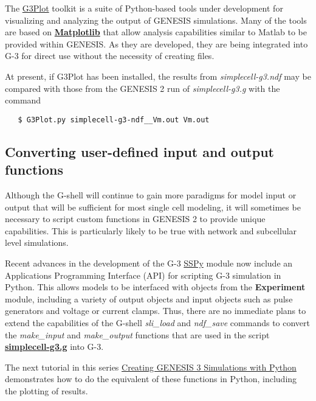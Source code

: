 \documentclass[12pt]{article}
\begin{document}
The \href{../g3plot/g3plot.html}{G3Plot} toolkit is a suite of Python-based tools under development
for visualizing and analyzing the output of GENESIS simulations.  Many of the tools are based on
\href{http://matplotlib.sourceforge.net/}{\bf Matplotlib} that allow
analysis capabilities similar to Matlab to be provided within GENESIS.  As
they are developed, they are being integrated into G-3 for direct use
without the necessity of creating files.

At present, if G3Plot has been installed, the results from {\it simplecell-g3.ndf} may be compared
with those from the GENESIS 2 run of {\it simplecell-g3.g} with the command
\begin{verbatim}
   $ G3Plot.py simplecell-g3-ndf__Vm.out Vm.out
\end{verbatim}

\subsection*{Converting user-defined input and output functions}

Although the G-shell will continue to gain more paradigms for model
input or output that will be sufficient for most single cell modeling,
it will sometimes be necessary to script custom functions in GENESIS 2
to provide unique capabilities.  This is particularly likely to be
true with network and subcellular level simulations.

Recent advances in the development of the G-3
\href{../SSPy/SSPy.html}{SSPy} module now include an Applications
Programming Interface (API) for scripting G-3 simulation in Python.  This
allows models to be interfaced with objects from the {\bf Experiment}
module, including a variety of output objects and input objects such as
pulse generators and voltage or current clamps.  Thus, there are no
immediate plans to extend the capabilities of the G-shell {\it sli\_load}
and {\it ndf\_save} commands to convert the {\it make\_input} and {\it
make\_output} functions that are used in the script
\href{figures/simplecell-g3.txt}{\bf simplecell-g3.g} into G-3.

The next tutorial in this series
\href{../tutorial-python-scripting/tutorial-python-scripting.html}
{Creating GENESIS 3 Simulations with Python} demonstrates how to do the
equivalent of these functions in Python, including the plotting of results.
\end{document}
